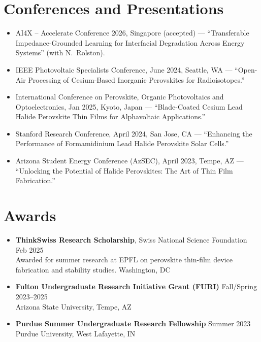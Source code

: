 \documentclass[10pt, letterpaper]{article}
\begin{document}
\section*{Conferences and Presentations}

\begin{itemize}
  \item AI4X -- Accelerate Conference 2026, Singapore (accepted) ---
    ``Transferable Impedance-Grounded Learning for Interfacial Degradation Across Energy Systems''
    (with N.\ Rolston).
  \item IEEE Photovoltaic Specialists Conference, June 2024, Seattle, WA ---
    ``Open-Air Processing of Cesium-Based Inorganic Perovskites for Radioisotopes.''
  \item International Conference on Perovskite, Organic Photovoltaics and Optoelectronics,
    Jan 2025, Kyoto, Japan ---
    ``Blade-Coated Cesium Lead Halide Perovskite Thin Films for Alphavoltaic Applications.''
  \item Stanford Research Conference, April 2024, San Jose, CA ---
    ``Enhancing the Performance of Formamidinium Lead Halide Perovskite Solar Cells.''
  \item Arizona Student Energy Conference (AzSEC), April 2023, Tempe, AZ ---
    ``Unlocking the Potential of Halide Perovskites: The Art of Thin Film Fabrication.''
\end{itemize}

\section*{Awards}

\begin{itemize}
  \item \textbf{ThinkSwiss Research Scholarship}, Swiss National Science Foundation \hfill Feb 2025 \\
    \small Awarded for summer research at EPFL on perovskite thin-film device fabrication and
    stability studies. \hfill Washington, DC
  \item \textbf{Fulton Undergraduate Research Initiative Grant (FURI)} \hfill Fall/Spring 2023--2025 \\
    \small Arizona State University, Tempe, AZ
  \item \textbf{Purdue Summer Undergraduate Research Fellowship} \hfill Summer 2023 \\
    \small Purdue University, West Lafayette, IN
\end{itemize}
\end{document}
